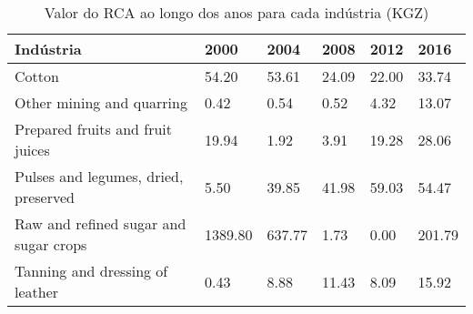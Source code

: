 \begin{table}
\centering
\caption{Valor do RCA ao longo dos anos para cada indústria (KGZ)}
\begin{tabular}{p{6cm}p{1.5cm}p{1.5cm}p{1.5cm}p{1.5cm}p{1.5cm}}
\toprule
                            Indústria &    2000 &   2004 &  2008 &  2012 &   2016 \\
\midrule
                               Cotton &   54.20 &  53.61 & 24.09 & 22.00 &  33.74 \\
            Other mining and quarring &    0.42 &   0.54 &  0.52 &  4.32 &  13.07 \\
     Prepared fruits and fruit juices &   19.94 &   1.92 &  3.91 & 19.28 &  28.06 \\
 Pulses and legumes, dried, preserved &    5.50 &  39.85 & 41.98 & 59.03 &  54.47 \\
Raw and refined sugar and sugar crops & 1389.80 & 637.77 &  1.73 &  0.00 & 201.79 \\
      Tanning and dressing of leather &    0.43 &   8.88 & 11.43 &  8.09 &  15.92 \\
\bottomrule
\end{tabular}
\end{table}
